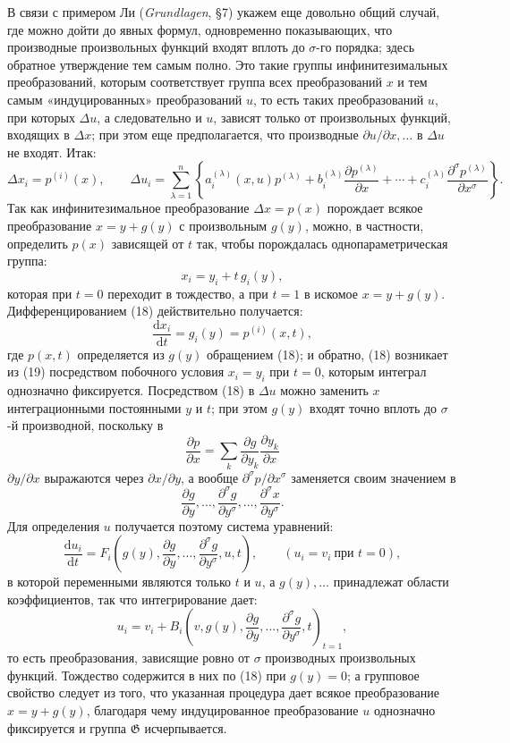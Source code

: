 \documentclass[11pt]{article}
\providecommand{\G}{\mathfrak G}
\providecommand{\D}{\Delta}
\providecommand{\p}{\partial}
\providecommand{\dd}{\mathrm d}
\begin{document}
В связи с примером Ли (\emph{Grundlagen}, \S{}7) укажем еще довольно общий случай, где можно дойти до явных формул, одновременно показывающих, что производные произвольных функций входят вплоть до \(\sigma\)-го порядка; здесь обратное утверждение тем самым полно. Это такие группы инфинитезимальных преобразований, которым соответствует группа всех преобразований \(x\) и тем самым «индуцированных» преобразований \(u\), то есть таких преобразований \(u\), при которых \(\D u\), а следовательно и \(u\), зависят только от произвольных функций, входящих в \(\D x\); при этом еще предполагается, что производные \(\p u/\p x,\ldots\) в \(\D u\) не входят. Итак:
\[
\D x_i=p^{(i)}(x),\qquad
\D u_i=
\sum_{\lambda=1}^{n}\left\{
a_i^{(\lambda)}(x,u)p^{(\lambda)}
+b_i^{(\lambda)}\frac{\p p^{(\lambda)}}{\p x}
+\cdots+
c_i^{(\lambda)}\frac{\p^\sigma p^{(\lambda)}}{\p x^\sigma}
\right\}.
\]
Так как инфинитезимальное преобразование \(\D x=p(x)\) порождает всякое преобразование \(x=y+g(y)\) с произвольным \(g(y)\), можно, в частности, определить \(p(x)\) зависящей от \(t\) так, чтобы порождалась однопараметрическая группа:
\begin{equation}
x_i=y_i+t\,g_i(y),
\tag{18}
\end{equation}
которая при \(t=0\) переходит в тождество, а при \(t=1\) в искомое \(x=y+g(y)\). Дифференцированием (18) действительно получается:
\begin{equation}
\frac{\dd x_i}{\dd t}=g_i(y)=p^{(i)}(x,t),
\tag{19}
\end{equation}
где \(p(x,t)\) определяется из \(g(y)\) обращением (18); и обратно, (18) возникает из (19) посредством побочного условия \(x_i=y_i\) при \(t=0\), которым интеграл однозначно фиксируется. Посредством (18) в \(\D u\) можно заменить \(x\) интеграционными постоянными \(y\) и \(t\); при этом \(g(y)\) входят точно вплоть до \(\sigma\)-й производной, поскольку в
\[
\frac{\p p}{\p x}=\sum_k\frac{\p g}{\p y_k}\frac{\p y_k}{\p x}
\]
\(\p y/\p x\) выражаются через \(\p x/\p y\), а вообще \(\p^\sigma p/\p x^\sigma\) заменяется своим значением в
\[
\frac{\p g}{\p y},\ldots,\frac{\p^\sigma g}{\p y^\sigma},\ldots,\frac{\p^\sigma x}{\p y^\sigma}.
\]
Для определения \(u\) получается поэтому система уравнений:
\[
\frac{\dd u_i}{\dd t}
=
F_i\!\left(g(y),\frac{\p g}{\p y},\ldots,\frac{\p^\sigma g}{\p y^\sigma},u,t\right),
\qquad (u_i=v_i\ \text{при }t=0),
\]
в которой переменными являются только \(t\) и \(u\), а \(g(y),\ldots\) принадлежат области коэффициентов, так что интегрирование дает:
\[
u_i=v_i+
B_i\!\left(v,g(y),\frac{\p g}{\p y},\ldots,\frac{\p^\sigma g}{\p y^\sigma},t\right)_{t=1},
\]
то есть преобразования, зависящие ровно от \(\sigma\) производных произвольных функций. Тождество содержится в них по (18) при \(g(y)=0\); а групповое свойство следует из того, что указанная процедура дает всякое преобразование \(x=y+g(y)\), благодаря чему индуцированное преобразование \(u\) однозначно фиксируется и группа \(\G\) исчерпывается.
\end{document}
